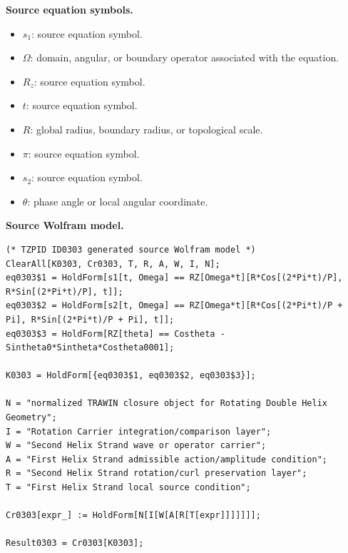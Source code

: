 \begin{minipage}[t]{0.49\linewidth}
\begingroup
\small
\raggedright
\textbf{Source equation symbols.}\par
\begin{itemize}[leftmargin=1.35em,itemsep=1pt,topsep=1pt,parsep=0pt]
    \item $s_1$: source equation symbol.
    \item $\Omega$: domain, angular, or boundary operator associated with the equation.
    \item $R_z$: source equation symbol.
    \item $t$: source equation symbol.
    \item $R$: global radius, boundary radius, or topological scale.
    \item $\pi$: source equation symbol.
    \item $s_2$: source equation symbol.
    \item $\theta$: phase angle or local angular coordinate.
\end{itemize}
\endgroup
\end{minipage}\hfill
\begin{minipage}[t]{0.47\linewidth}
\begingroup
\scriptsize
\raggedright
\textbf{Source Wolfram model.}\par
\begin{Verbatim}[fontsize=\tiny,breaklines=true,breakanywhere=true]
(* TZPID ID0303 generated source Wolfram model *)
ClearAll[K0303, Cr0303, T, R, A, W, I, N];
eq0303$1 = HoldForm[s1[t, Omega] == RZ[Omega*t][R*Cos[(2*Pi*t)/P], R*Sin[(2*Pi*t)/P], t]];
eq0303$2 = HoldForm[s2[t, Omega] == RZ[Omega*t][R*Cos[(2*Pi*t)/P + Pi], R*Sin[(2*Pi*t)/P + Pi], t]];
eq0303$3 = HoldForm[RZ[theta] == Costheta - Sintheta0*Sintheta*Costheta0001];

K0303 = HoldForm[{eq0303$1, eq0303$2, eq0303$3}];

N = "normalized TRAWIN closure object for Rotating Double Helix Geometry";
I = "Rotation Carrier integration/comparison layer";
W = "Second Helix Strand wave or operator carrier";
A = "First Helix Strand admissible action/amplitude condition";
R = "Second Helix Strand rotation/curl preservation layer";
T = "First Helix Strand local source condition";

Cr0303[expr_] := HoldForm[N[I[W[A[R[T[expr]]]]]]];

Result0303 = Cr0303[K0303];
\end{Verbatim}
\endgroup
\end{minipage}

